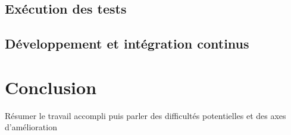 \documentclass[french]{article}
\begin{document}
    \subsection{Exécution des tests}
    \subsection{Développement et intégration continus}
    
    
    \newpage
    \section*{Conclusion}
    Résumer le travail accompli puis parler des difficultés potentielles et des axes d'amélioration
    
    


    
\end{document}
